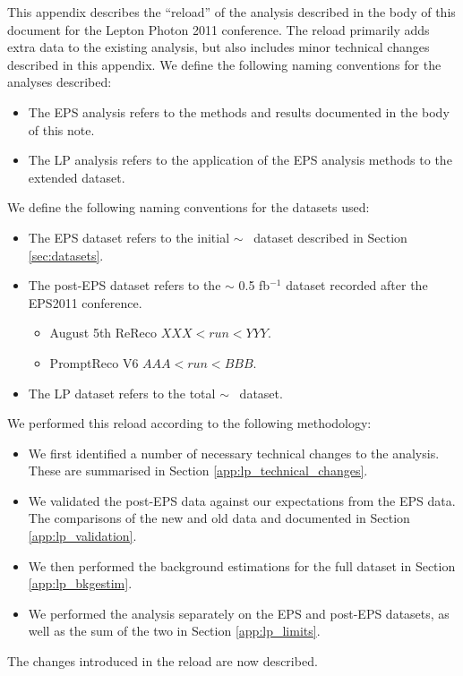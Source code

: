 
This appendix describes the ``reload'' of the analysis described in the body
of this document for the Lepton Photon 2011 conference.
The reload primarily adds extra data to the existing analysis, but also 
includes minor technical changes described in this appendix.
We define the following naming conventions for the analyses described:

\begin{itemize}
    \item The EPS analysis refers to the methods and results documented in the body of this note.
    \item The LP analysis refers to the application of the EPS analysis methods to the extended dataset.
\end{itemize}

We define the following naming conventions for the datasets used:

\begin{itemize}
    \item The EPS dataset refers to the initial $\sim$ \intlumi~dataset described in Section \ref{sec:datasets}.
    \item The post-EPS dataset refers to the $\sim$ 0.5 fb$^{-1}$ dataset recorded after the EPS2011 conference.
    \begin{itemize}
        \item August 5th ReReco $XXX<run<YYY$.
        \item PromptReco V6 $AAA<run<BBB$.
    \end{itemize}
    \item The LP dataset refers to the total $\sim$ \lpintlumi~dataset.
\end{itemize}

We performed this reload according to the following methodology:

\begin{itemize}
    \item We first identified a number of necessary technical changes to the analysis.  
These are summarised in Section \ref{app:lp_technical_changes}.
    \item We validated the post-EPS data against our expectations from the EPS data.
The comparisons of the new and old data and documented in Section \ref{app:lp_validation}.
    \item We then performed the background estimations for the full dataset in Section \ref{app:lp_bkgestim}.
    \item We performed the analysis separately on the EPS and post-EPS datasets, 
as well as the sum of the two in Section \ref{app:lp_limits}.
\end{itemize}

The changes introduced in the reload are now described.

